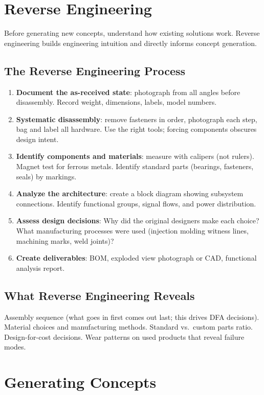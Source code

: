 \documentclass[11pt,letterpaper,twoside,openany]{book}
\begin{document}
\section{Reverse Engineering}
Before generating new concepts, understand how existing solutions work. Reverse engineering builds engineering intuition and directly informs concept generation.

\subsection{The Reverse Engineering Process}
\begin{enumerate}[leftmargin=1.5em]
\item \textbf{Document the as-received state}: photograph from all angles before disassembly. Record weight, dimensions, labels, model numbers.
\item \textbf{Systematic disassembly}: remove fasteners in order, photograph each step, bag and label all hardware. Use the right tools; forcing components obscures design intent.
\item \textbf{Identify components and materials}: measure with calipers (not rulers). Magnet test for ferrous metals. Identify standard parts (bearings, fasteners, seals) by markings.
\item \textbf{Analyze the architecture}: create a block diagram showing subsystem connections. Identify functional groups, signal flows, and power distribution.
\item \textbf{Assess design decisions}: Why did the original designers make each choice? What manufacturing processes were used (injection molding witness lines, machining marks, weld joints)?
\item \textbf{Create deliverables}: BOM, exploded view photograph or CAD, functional analysis report.
\end{enumerate}

\subsection{What Reverse Engineering Reveals}
Assembly sequence (what goes in first comes out last; this drives DFA decisions). Material choices and manufacturing methods. Standard vs.\ custom parts ratio. Design-for-cost decisions. Wear patterns on used products that reveal failure modes.

\section{Generating Concepts}
\end{document}
